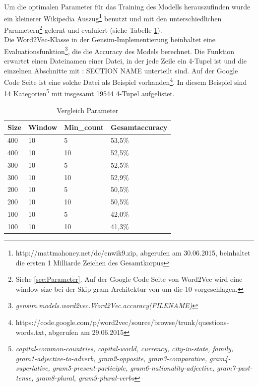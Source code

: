 \documentclass[12pt,a4paper]{report}
\begin{document}
Um die optimalen Parameter für das Training des Modells herauszufinden wurde ein kleinerer Wikipedia Auszug\footnote{http://mattmahoney.net/dc/enwik9.zip, abgerufen am 30.06.2015, beinhaltet die ersten 1 Milliarde Zeichen des Gesamtkorpus} benutzt und mit den unterschiedlichen Parametern\footnote{Siehe \ref{sec:Parameter}. Auf der Google Code Seite von Word2Vec wird eine window size bei der Skip-gram Architektur von um die 10 vorgeschlagen.} gelernt und evaluiert (siehe Tabelle \ref{tab:VergleichParameter}).\\
Die Word2Vec-Klasse in der Gensim-Implementierung beinhaltet eine Evaluationsfunktion\footnote{\textit{gensim.models.word2vec.Word2Vec.accuracy(FILENAME)}}, die die Accuracy des Models berechnet. Die Funktion erwartet einen Dateinamen einer Datei, in der jede Zeile ein 4-Tupel ist und die einzelnen Abschnitte mit \glqq : SECTION NAME\grqq{} unterteilt sind. Auf der Google Code Seite ist eine solche Datei als Beispiel vorhanden\footnote{https://code.google.com/p/word2vec/source/browse/trunk/questions-words.txt, abgerufen am 29.06.2015}. In diesem Beispiel sind 14 Kategorien\footnote{\textit{capital-common-countries, capital-world, currency, city-in-state, family, gram1-adjective-to-adverb, gram2-opposite, gram3-comparative, gram4-superlative, gram5-present-participle, gram6-nationality-adjective, gram7-past-tense, gram8-plural, gram9-plural-verbs}} mit insgesamt 19544 4-Tupel aufgelistet.\\

\begin{table}[h]
\label{tab:VergleichParameter}
\caption{Vergleich Parameter}
\begin{center}
\begin{tabular}{l|l|l|l}\\
\textbf{Size} & \textbf{Window} & \textbf{Min\_count} & \textbf{Gesamtaccuracy}\\
\hline	
400 & 10 &  5 & 53,5\%\\
400 & 10 & 10 & 52,5\%\\
300 & 10 &  5 & 52,5\%\\
300 & 10 & 10 & 52,9\%\\
200 & 10 &  5 & 50,5\%\\
200 & 10 & 10 & 50,5\%\\
100 & 10 &  5 & 42,0\%\\
100 & 10 & 10 & 41,3\%\\

\end{tabular}
\end{center}
\end{table}
\end{document}
